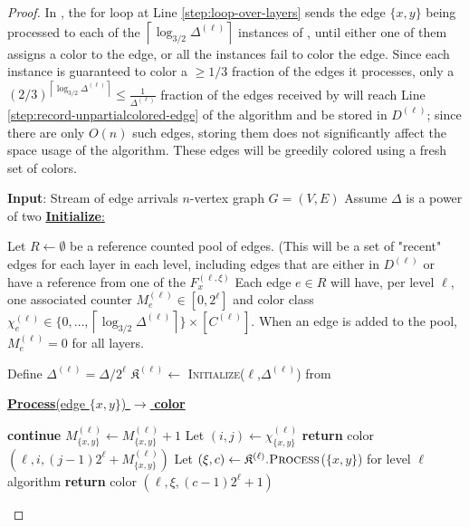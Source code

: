\documentclass[10pt]{article}
\theoremstyle{definition}\newtheorem{definition}[lemma]{Definition}
\theoremstyle{remark}  \newtheorem*{remark}{Remark}
\newcommand{\ceil}[1]{{\left\lceil{#1}\right\rceil}}
\newcommand{\pell}{{(\ell)}} %
\begin{document}
\begin{proof}
  In , the for loop at Line \ref{step:loop-over-layers} sends the edge $\{x,y\}$ being processed to each of the $\ceil{\log_{3/2} \Delta^\pell}$ instances of , until either one of them assigns a color to the edge, or all the instances fail to color the edge. Since each instance is guaranteed to color a $\ge 1/3$ fraction of the edges it processes, only a $(2/3)^\ceil{\log_{3/2} \Delta^\pell} \le \frac{1}{\Delta^\pell}$ fraction of the edges received by  will reach Line \ref{step:record-unpartialcolored-edge} of the algorithm and be stored in $D^\pell$; since there are only $O(n)$ such edges, storing them does not significantly affect the space usage of the algorithm. These edges will be greedily colored using a fresh set of colors.
  
  \begin{algorithm}[ht!]
    \caption{Deterministic algorithm for $O(\Delta (\log \Delta)^2)$ edge coloring for multigraph edge arrival streams\label{alg:det-ea-edgecol}}
    \begin{algorithmic}[1]
    \Statex \textbf{Input}: Stream of edge arrivals $n$-vertex graph $G=(V,E)$
      \Statex Assume $\Delta$ is a power of two
      \Statex
      \Statex \underline{\textbf{Initialize}:}
      
      \State Let $R \gets \emptyset$ be a reference counted pool of edges. (This will be a set of "recent" edges for each layer in each level, including edges that are either in $D^\pell$ or have a reference from one of the $F_x^{(\ell,\xi)}$
      \State Each edge $e \in R$ will have, per level $\ell$, one associated counter $M^\pell_{e} \in [0, 2^\ell]$ and color class $\chi^\pell_{e} \in \{0,\ldots,\ceil{\log_{3/2}{\Delta^\pell}}\} \times [C^\pell]$. When an edge is added to the pool, $M^\pell_{e} = 0$ for all layers.
      
        \State Define $\Delta^\pell = \Delta / 2^\ell$
        \State $\mathfrak{K}^\pell \gets$ \textsc{Initialize}($\ell$,$\Delta^\pell$) from 
      \EndFor
      
    \Statex 
    \Statex\underline{\textbf{Process}(edge $\{x,y\}$) $\rightarrow$ \textbf{color}}
      
      \label{step:det-ea-edgecol-outer-loop}
        \If{$\{x,y\}$ is in $R$ and $M^\pell_{\{x,y\}} > 0$}
          \If{$M^\pell_{\{x,y\}} = 2^\ell$}
            \State \textbf{continue}\label{step:skip-to-next-level}
          \Else
            \State $M^\pell_{\{x,y\}} \gets M^\pell_{\{x,y\}} + 1$
            \State Let $(i,j) \gets \chi^\pell_{\{x,y\}}$
            \State \textbf{return} color $\left(\ell, i,  (j - 1) 2^\ell + M^\pell_{\{x,y\}}\right)$
          \EndIf
        \Else
          \State Let $(\xi, c) \gets \mathfrak{K}^\pell.\textsc{Process}$($\{x,y\}$) for level $\ell$ algorithm
          \State \textbf{return} color $\left(\ell, \xi,  (c - 1) 2^\ell + 1\right)$
        \EndIf
      \EndFor
    \end{algorithmic}
  \end{algorithm}
  

\end{proof}
\end{document}
